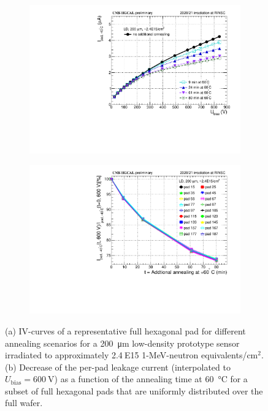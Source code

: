 \begin{figure}
	\captionsetup[subfigure]{aboveskip=-1pt,belowskip=-1pt}
	\centering
	\begin{subfigure}[b]{0.49\textwidth}
		\includegraphics[width=0.999\textwidth]{plots/annealing_iv/annealing_IV_ch24.pdf}
		\subcaption{
		}
		\label{plot:annealing_IV}
	\end{subfigure}
	\hfill
	\begin{subfigure}[b]{0.49\textwidth}
		\includegraphics[width=0.999\textwidth]{plots/annealing_iv/annealing_current.pdf}
		\subcaption{
		}
		\label{plot:annealing_current}
	\end{subfigure}    

	\caption{
		(a) IV-curves of a representative full hexagonal pad for different annealing scenarios for a \SI{200}{\micro\metre} low-density prototype sensor irradiated to approximately 2.4$~$E15 1-MeV-neutron equivalents/cm$^{2}$.
        (b) Decrease of the per-pad leakage current (interpolated to $U_\text{bias}=\SI{600}{\volt}$) as a function of the annealing time at \SI{60}{\celsius} for a subset of full hexagonal pads that are uniformly distributed over the full wafer.
	}
\end{figure}
